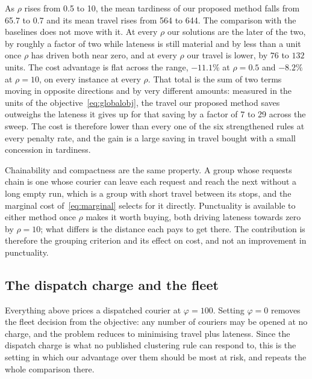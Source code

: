As $\rho$ rises from 0.5 to 10, the mean tardiness of our proposed method
falls from 65.7 to 0.7 and its mean travel rises from 564 to
644.
The comparison with the baselines does not move with it. At every $\rho$ our
solutions are the later of the two, by roughly a factor of two while lateness is
still material and by less than a unit once $\rho$ has driven both near zero, and
at every $\rho$ our travel is lower, by $76$ to $132$ units.
The cost advantage is flat across the range, $-11.1\%$ at
$\rho=0.5$ and $-8.2\%$ at $\rho=10$, on every instance at
every $\rho$. That total is the sum of two terms moving in opposite directions
and by very different amounts: measured in the units of
the objective~\eqref{eq:globalobj}, the travel our proposed method saves
outweighs the lateness it gives up for that saving by a factor of 7 to
29 across the sweep. The cost is therefore lower than every one of the
six strengthened rules at every penalty rate, and the gain is a large saving
in travel bought with a small concession in tardiness.

Chainability and compactness are the same property. A group whose requests chain
is one whose courier can leave each request and reach the next without a long
empty run, which is a group with short travel between its stops, and the marginal
cost of~\eqref{eq:marginal} selects for it directly. Punctuality is available to
either method once $\rho$ makes it worth buying, both driving lateness towards
zero by $\rho=10$; what differs is the distance each pays to get there. The
contribution is therefore the grouping criterion and its effect on cost, and not
an improvement in punctuality.

\subsection{The dispatch charge and the fleet}\label{sec:fleetcharge}
\label{sec:phizero}
Everything above prices a dispatched courier at $\varphi = 100$. Setting
$\varphi = 0$ removes the fleet decision from the objective: any number of
couriers may be opened at no charge, and the problem reduces to minimising
travel plus lateness. Since the dispatch charge is what no published clustering
rule can respond to, this is the setting in which our advantage over them should
be most at risk, and  repeats the whole comparison there.

